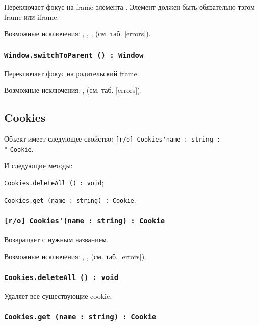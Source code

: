 Переключает фокус на frame элемента . Элемент должен быть обязательно тэгом frame или iframe.

Возможные исключения: , , ,  (см. таб. \ref{errors}).

\subsubsection{\lstinline|Window.switchToParent () : Window|}

Переключает фокус на родительский frame.

Возможные исключения: ,  (см. таб. \ref{errors}).

\subsection{{\color{orange} Cookies}}

Объект \cookies{} имеет следующее свойство: \lstinline|[r/o] Cookies'name : string :|\\* \lstinline|Cookie|.

И следующие методы: 
\begin{icItems}
	\item \lstinline|Cookies.deleteAll () : void|;
	\item \lstinline|Cookies.get (name : string) : Cookie|.
\end{icItems}

\subsubsection{\lstinline|[r/o] Cookies'(name : string) : Cookie|}

Возвращает \cookie{} с нужным названием.

Возможные исключения: , ,  (см. таб. \ref{errors}).

\subsubsection{\lstinline|Cookies.deleteAll () : void|}

Удаляет все существующие cookie.

\subsubsection{\lstinline|Cookies.get (name : string) : Cookie|}

